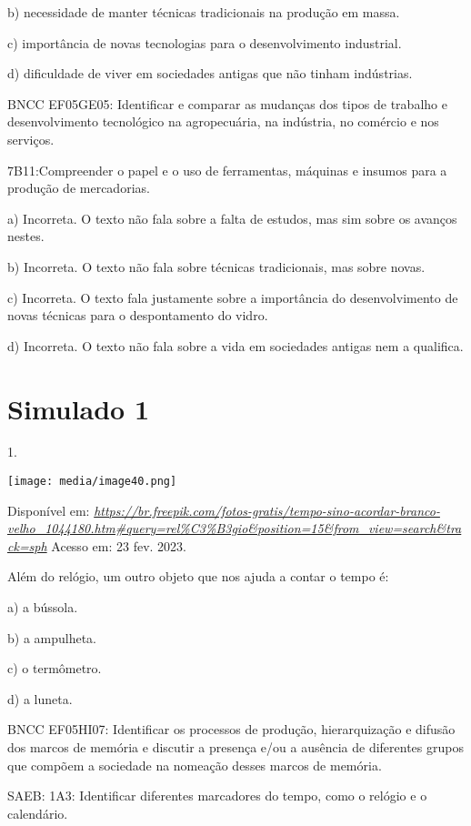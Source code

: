 b) necessidade de manter técnicas tradicionais na produção em massa.

c) importância de novas tecnologias para o desenvolvimento industrial.

d) dificuldade de viver em sociedades antigas que não tinham indústrias.

BNCC EF05GE05: Identificar e comparar as mudanças dos tipos de trabalho
e desenvolvimento tecnológico na agropecuária, na indústria, no comércio
e nos serviços.

7B11:Compreender o papel e o uso de ferramentas, máquinas e insumos para
a produção de mercadorias.

a) Incorreta. O texto não fala sobre a falta de estudos, mas sim sobre
os avanços nestes.

b) Incorreta. O texto não fala sobre técnicas tradicionais, mas sobre
novas.

c) Incorreta. O texto fala justamente sobre a importância do
desenvolvimento de novas técnicas para o despontamento do vidro.

d) Incorreta. O texto não fala sobre a vida em sociedades antigas nem a
qualifica.

\section{Simulado 1 }\label{simulado-1}

1.

\texttt{[image: media/image40.png]}

Disponível em:
\href{https://br.freepik.com/fotos-gratis/tempo-sino-acordar-branco-velho_1044180.htm\#query=rel\%C3\%B3gio\&position=15\&from_view=search\&track=sph}{\emph{https://br.freepik.com/fotos-gratis/tempo-sino-acordar-branco-velho\_1044180.htm\#query=rel\%C3\%B3gio\&position=15\&from\_view=search\&track=sph}}
Acesso em: 23 fev. 2023.

Além do relógio, um outro objeto que nos ajuda a contar o tempo é:

a) a bússola.

b) a ampulheta.

c) o termômetro.

d) a luneta.

BNCC EF05HI07: Identificar os processos de produção, hierarquização e
difusão dos marcos de memória e discutir a presença e/ou a ausência de
diferentes grupos que compõem a sociedade na nomeação desses marcos de
memória.

SAEB: 1A3: Identificar diferentes marcadores do tempo, como o relógio e
o calendário.


